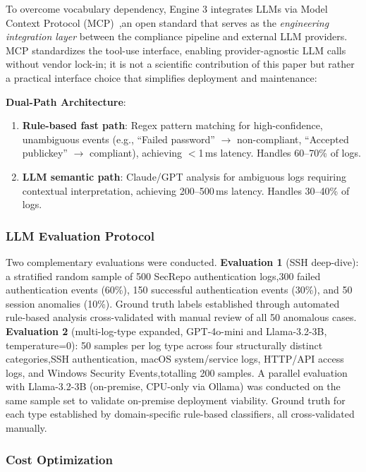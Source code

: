 \documentclass[futureinternet,article,submit,pdftex,moreauthors]{Definitions/mdpi}
\begin{document}
To overcome vocabulary dependency, Engine 3 integrates LLMs via Model Context
Protocol (MCP)~\cite{mcp_anthropic,mcp_spec},an open standard that serves as the
\textit{engineering integration layer} between the compliance pipeline and external LLM
providers. MCP standardizes the tool-use interface, enabling provider-agnostic LLM calls
without vendor lock-in; it is not a scientific contribution of this paper but rather
a practical interface choice that simplifies deployment and maintenance:

\textbf{Dual-Path Architecture}:
\begin{enumerate}
\item \textbf{Rule-based fast path}: Regex pattern matching for high-confidence, unambiguous
events (e.g., ``Failed password'' $\rightarrow$ non-compliant, ``Accepted publickey''
$\rightarrow$ compliant), achieving ${<}$1\,ms latency. Handles 60--70\% of logs.
\item \textbf{LLM semantic path}: Claude/GPT analysis for ambiguous logs requiring contextual
interpretation, achieving 200--500\,ms latency. Handles 30--40\% of logs.
\end{enumerate}

\subsubsection{LLM Evaluation Protocol}

Two complementary evaluations were conducted. \textbf{Evaluation 1} (SSH deep-dive): a
stratified random sample of 500 SecRepo authentication logs,300 failed authentication events
(60\%), 150 successful authentication events (30\%), and 50 session anomalies (10\%). Ground
truth labels established through automated rule-based analysis cross-validated with manual
review of all 50 anomalous cases. \textbf{Evaluation 2} (multi-log-type expanded, GPT-4o-mini and Llama-3.2-3B,
temperature=0): 50 samples per log type across four structurally distinct categories,SSH
authentication, macOS system/service logs, HTTP/API access logs, and Windows Security
Events,totalling 200 samples. A parallel evaluation with Llama-3.2-3B (on-premise, CPU-only
via Ollama) was conducted on the same sample set to validate on-premise deployment viability.
Ground truth for each type established by domain-specific rule-based classifiers, all
cross-validated manually.

\subsubsection{Cost Optimization}
\end{document}
